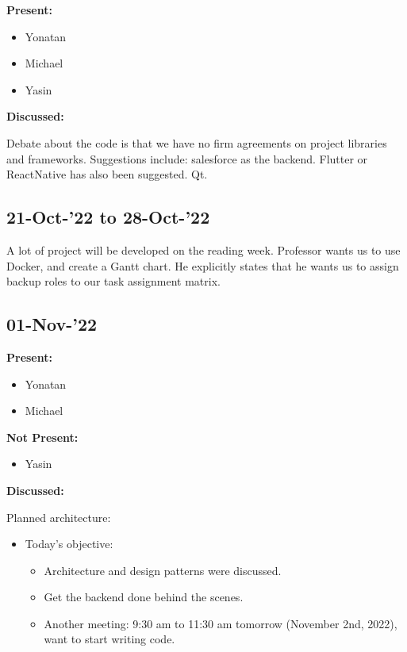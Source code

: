 \documentclass[11pt]{article}
\begin{document}
    \textbf{Present:}
    \begin{itemize}
        \item Yonatan
        \item Michael
        \item Yasin
    \end{itemize}

    \textbf{Discussed:}

    Debate about the code is that we have no firm agreements on project libraries and frameworks.
    Suggestions include: salesforce as the backend.
    Flutter or ReactNative has also been suggested.
    Qt.

    \subsection{21-Oct-’22 to 28-Oct-’22}\label{subsec:21-oct-22-to-28-oct-22}


    A lot of project will be developed on the reading week.
    Professor wants us to use Docker, and create a Gantt chart.
    He explicitly states that he wants us to assign backup roles to our task assignment matrix.

    \subsection{01-Nov-’22}\label{subsec:01-nov-22}

    \textbf{Present:}
    \begin{itemize}
        \item Yonatan
        \item Michael
    \end{itemize}

    \textbf{Not Present:}

    \begin{itemize}
        \item Yasin
    \end{itemize}

    \textbf{Discussed:}

    \item    Planned architecture:
    \begin{itemize}
        \begin{itemize}
            \item repository style for the databases.
            \item Event-driven for reminders.
            \item Component-based.
        \end{itemize}
        \item Today's objective:
        \begin{itemize}
            \item Architecture and design patterns were discussed.
            \item Get the backend done behind the scenes.
            \item Another meeting: 9:30 am to 11:30 am tomorrow (November 2nd, 2022), want to start writing code.
        \end{itemize}
    \end{itemize}
\end{document}
